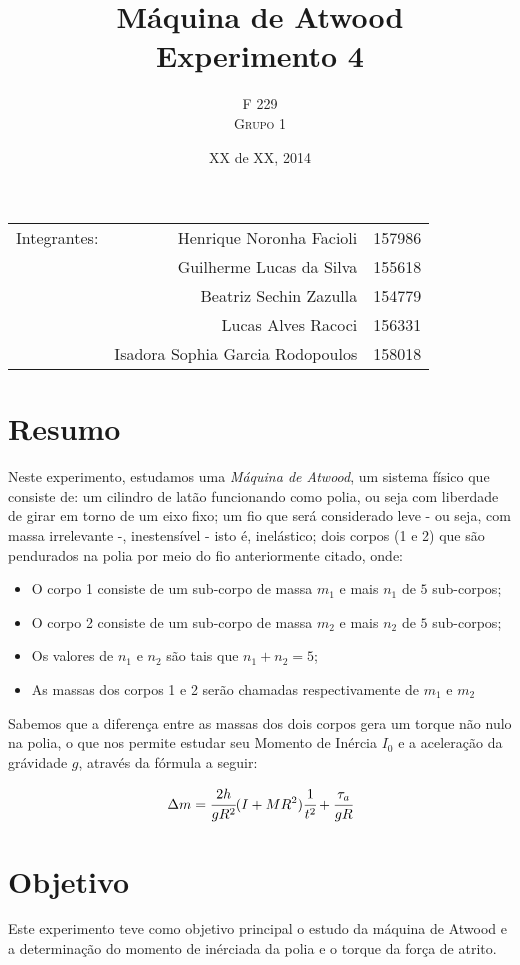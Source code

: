 \documentclass{article}
\title{Máquina de Atwood \\ Experimento 4} %
\author{F 229 \\ \textsc{Grupo 1}}
\date{XX de XX, 2014}
\begin{document}
\maketitle

\begin{center}
	\begin{tabular}{l r l}
		Integrantes: & Henrique Noronha Facioli & 157986 \\
		& Guilherme Lucas da Silva & 155618 \\
		& Beatriz Sechin Zazulla & 154779 \\
		& Lucas Alves Racoci & 156331 \\
		& Isadora Sophia Garcia Rodopoulos & 158018 \\
	\end{tabular}
\end{center}


\section{Resumo}
Neste experimento, estudamos uma \emph{Máquina de Atwood}, um sistema físico que consiste de: um cilindro de latão funcionando como polia, ou seja com liberdade de girar em torno de um eixo fixo; um fio que será considerado leve - ou seja, com massa irrelevante -, inestensível - isto é, inelástico; dois corpos (1 e 2) que são pendurados na polia por meio do fio anteriormente citado, onde:
\begin{itemize} 
	\item O corpo 1 consiste de um sub-corpo de massa ${m}_{1}$ e mais $n_{1}$ de $5$ sub-corpos; 
	\item O corpo 2 consiste de um sub-corpo de massa ${m}_{2}$ e mais $n_{2}$ de $5$ sub-corpos; 
	\item Os valores de $n_{1}$ e $n_{2}$ são tais que $n_{1}+n_{2}=5$; 
	\item As massas dos corpos 1 e 2 serão chamadas respectivamente de $m_{1}$ e $m_{2}$ 
\end {itemize} 

Sabemos que a diferença entre as massas dos dois corpos gera um torque não nulo na polia, o que nos permite estudar seu Momento de Inércia $I_{0}$ e a aceleração da grávidade $g$, através da fórmula a seguir:

\[
\Delta m=\cfrac{2h}{gR^{2}}(I+MR^{2})\ensuremath{\cfrac{1}{t^{2}}}+\cfrac{\tau_{a}}{gR}
\]


\section{Objetivo}
Este experimento teve como objetivo principal o estudo da máquina de Atwood e a determinação do momento de inérciada da polia e o torque da força de atrito.
\end{document}
